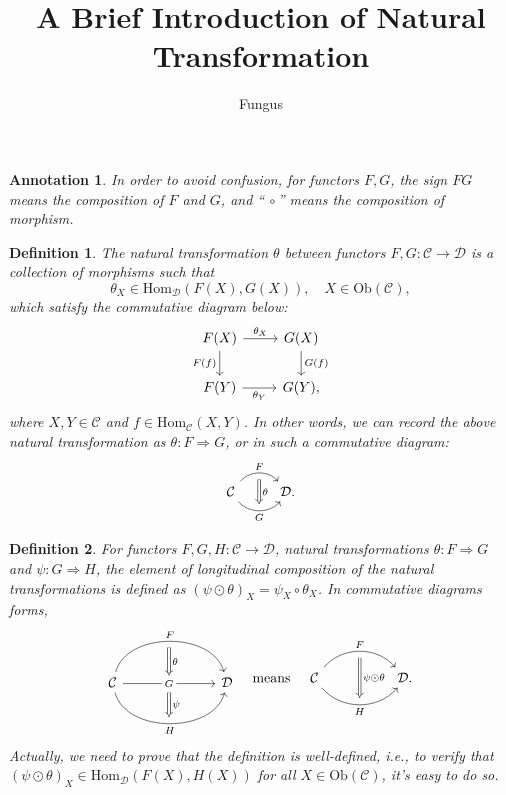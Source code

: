 \documentclass{article}
\title{A Brief Introduction of Natural Transformation}
\author{Fungus}
\begin{document}
\maketitle
\newtheorem{defi}{Definition}	\newtheorem{thm}{Theorem}	\newtheorem{ano}{Annotation}

\begin{ano}
In order to avoid confusion, for functors $F,G$, the sign $FG$ means the composition of $F$ and $G$, and ``$\ \circ$'' means the composition of morphism.
\end{ano}


\begin{defi}\label{natural transformation}
	The {\rm natural transformation} $\theta$ between functors $F,G:\mathcal{C}\to\mathcal{D}$ is a collection of morphisms such that
	\[\theta_X\in\mathrm{Hom}_\mathcal{D}(F(X),G(X)),\quad X\in\mathrm{Ob}(\mathcal{C}),\]
	which satisfy the commutative diagram below:
	\begin{equation}\begin{tikzcd}
		F(X) \arrow[r,"\theta_X"] \arrow[d,"F(f)"'] & G(X) \arrow[d,"G(f)"] \\
		F(Y) \arrow[r,"\theta_Y"'] & G(Y),
	\end{tikzcd}\end{equation}
	where $X,Y\in\mathcal{C}$ and $f\in\mathrm{Hom}_\mathcal{C}(X,Y)$. In other words, we can record the above natural transformation as $\theta:F\Rightarrow G$, or in such a commutative diagram:
	\[\begin{tikzcd}
		\mathcal{C} \arrow[r, "F", bend left=50, ""' name=F] \arrow[r, "G"', bend right=50, "" name=G] & \arrow[Rightarrow, from=F, to=G, "\theta"] \mathcal{D}.
	\end{tikzcd}\]
\end{defi}


\begin{defi}\label{longitudinal composition}
	For functors $F,G,H:\mathcal{C}\to\mathcal{D}$, natural transformations $\theta:F\Rightarrow G$ and $\psi:G\Rightarrow H$, the element of {\rm longitudinal composition} of the natural transformations is defined as $(\psi\odot\theta)_X=\psi_X\circ\theta_X$. In commutative diagrams forms,
	\[\begin{tikzcd}
			& \arrow[d,Rightarrow,"\theta"]& \\
			\mathcal{C} \arrow[rr, "F", bend left=75] \arrow[rr, "H"', bend right=75] \arrow[rr, "G" description] &
			\textcolor{white}{s} \arrow[d,Rightarrow,"\psi"] &
			\mathcal{D}\\ & \quad &
		\end{tikzcd}\quad\text{means}\quad\begin{tikzcd}
			\mathcal{C}
			\arrow[bend left=50, rr, "F", ""' name=F]
			\arrow[bend right=50, rr, "H"', "" name=H] & & 
			\arrow[Rightarrow, from=F, to=H, "\psi\odot\theta"] \mathcal{D}.
	\end{tikzcd}\]
	Actually, we need to prove that the definition is well-defined, i.e., to verify that $(\psi\odot\theta)_X\in\mathrm{Hom}_\mathcal{D}(F(X),H(X))$ for all $X\in\mathrm{Ob}(\mathcal{C})$, it's easy to do so.
\end{defi}
\end{document}
